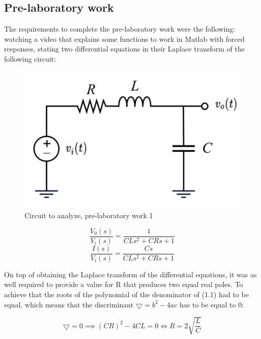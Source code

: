 \documentclass[a4paper,12pt]{article}
\begin{document}
\vspace{1cm}

\subsection{Pre-laboratory work}

\vspace{0.5cm}

The requirements to complete the pre-laboratory work were the following: watching a video that explains some functions to work in Matlab with forced responses, stating two differential equations in their Laplace transform of the following circuit:

\vspace{0.5cm}

\begin{figure}[H]
    \centering
    \includegraphics[width=0.5\linewidth]{circuit_lab_1.png}
    \caption{Circuit to analyze, pre-laboratory work 1}
    \label{fig:Lab 1 circuit}
\end{figure}

\vspace{0.5cm}

\begin{equation}
\frac{V_0(s)}{V_i(s)} = \frac{1}{CLs^2 + CRs + 1} 
\end{equation}
\begin{equation}    
\frac{I(s)}{V_i(s)} = \frac{Cs}{CLs^2 + CRs + 1}
\end{equation}

\vspace{0.5cm}

On top of obtaining the Laplace transform of the differential equations, it was as well required to provide a value for R that produces two equal real poles. To achieve that the roots of the polynomial of the denominator of (1.1) had to be equal, which means that the discriminant \(\bigtriangledown=b^2-4ac\) has to be equal to 0:

\vspace{0.5cm}

\[
\bigtriangledown = 0 \implies (CR)^2 - 4CL = 0 \iff R = 2\sqrt{\frac{L}{C}}
\]
\end{document}
